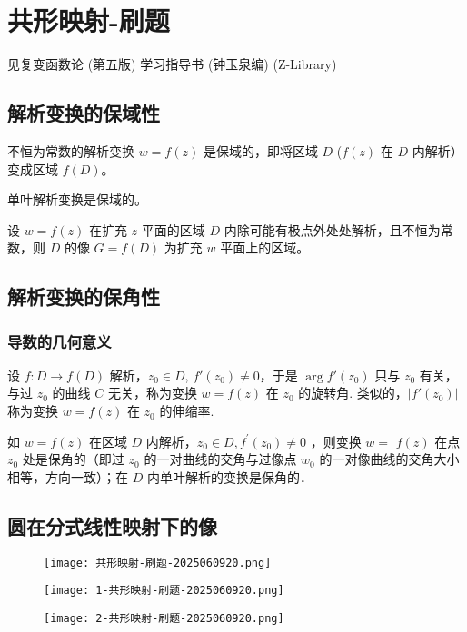 \section{共形映射-刷题}

见复变函数论 (第五版) 学习指导书 (钟玉泉编) (Z-Library)

\subsection{解析变换的保域性}

\begin{theorem}
不恒为常数的解析变换 $w=f(z)$ 是保域的，即将区域 $D$ ($f(z)$ 在 $D$ 内解析）变成区域 $f(D)$。
\end{theorem}
\begin{corollary}
单叶解析变换是保域的。
\end{corollary}
\begin{theorem}[(定理7.1的推广)]
设 $w=f(z)$ 在扩充 $z$ 平面的区域 $D$ 内除可能有极点外处处解析，且不恒为常数，则 $D$ 的像 $G=f(D)$ 为扩充 $w$ 平面上的区域。
\end{theorem}
\subsection{解析变换的保角性}

\subsubsection{导数的几何意义}

设 $f:D\to f(D)$ 解析，$z_0\in D$, $f'(z_0)\neq0$，于是 $\arg f'(z_0)$ 只与 $z_0$ 有关，与过 $z_0$ 的曲线 $C$ 无关，称为变换 $w=f(z)$ 在 $z_0$ 的旋转角. 类似的，$\lvert f'(z_0) \rvert$ 称为变换 $w=f(z)$ 在 $z_0$ 的伸缩率.

\begin{theorem}[定理 7.4]
如 $w=f(z)$ 在区域 $D$ 内解析，$z_0 \in D, f^{\prime}\left(z_0\right) \neq 0$ ，则变换 $w=$ $f(z)$ 在点 $z_0$ 处是保角的（即过 $z_0$ 的一对曲线的交角与过像点 $w_0$ 的一对像曲线的交角大小相等，方向一致）；在 $D$ 内单叶解析的变换是保角的．
\end{theorem}
\subsection{圆在分式线性映射下的像}

\begin{figure}[H]
\centering
\texttt{[image: 共形映射-刷题-2025060920.png]}
\label{}
\end{figure}
\begin{figure}[H]
\centering
\texttt{[image: 1-共形映射-刷题-2025060920.png]}
\label{}
\end{figure}
\begin{figure}[H]
\centering
\texttt{[image: 2-共形映射-刷题-2025060920.png]}
\label{}
\end{figure}

